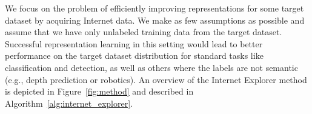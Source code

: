 We focus on the problem of efficiently improving representations for some target dataset by acquiring Internet data.
We make as few assumptions as possible and assume that we have only unlabeled training data from the target dataset. 
Successful representation learning in this setting would lead to better performance on the target dataset distribution for standard tasks like classification and detection, as well as others where the labels are not semantic (e.g., depth prediction or robotics).
An overview of the Internet Explorer method is depicted in Figure~\ref{fig:method} and described in Algorithm~\ref{alg:internet_explorer}.

